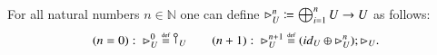 %
%
For all natural numbers $n \in \mathbb{N}$ one can define $\rhd_{U}^n\coloneqq \bigoplus_{i=1}^n U\to U$ as follows:
\begin{equation}\label{eq:codiagn in appendice}
    (n=0):\  \codiag{U}^0\defeq\cobang{U}\qquad (n+1):\ \codiag{U}^{n+1}\defeq(\id{U} \oplus \codiag{U}^n  );\codiag{U}.
\end{equation}







